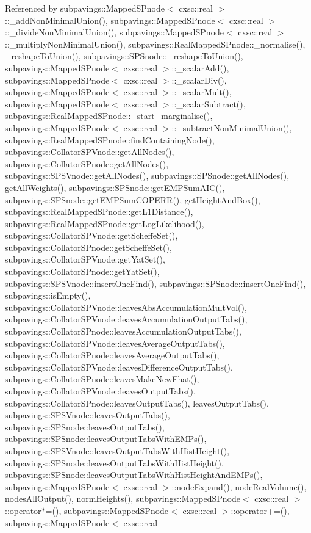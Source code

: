 \-Referenced by subpavings\-::\-Mapped\-S\-Pnode$<$ cxsc\-::real $>$\-::\-\_\-add\-Non\-Minimal\-Union(), subpavings\-::\-Mapped\-S\-Pnode$<$ cxsc\-::real $>$\-::\-\_\-divide\-Non\-Minimal\-Union(), subpavings\-::\-Mapped\-S\-Pnode$<$ cxsc\-::real $>$\-::\-\_\-multiply\-Non\-Minimal\-Union(), subpavings\-::\-Real\-Mapped\-S\-Pnode\-::\-\_\-normalise(), \-\_\-reshape\-To\-Union(), subpavings\-::\-S\-P\-Snode\-::\-\_\-reshape\-To\-Union(), subpavings\-::\-Mapped\-S\-Pnode$<$ cxsc\-::real $>$\-::\-\_\-scalar\-Add(), subpavings\-::\-Mapped\-S\-Pnode$<$ cxsc\-::real $>$\-::\-\_\-scalar\-Div(), subpavings\-::\-Mapped\-S\-Pnode$<$ cxsc\-::real $>$\-::\-\_\-scalar\-Mult(), subpavings\-::\-Mapped\-S\-Pnode$<$ cxsc\-::real $>$\-::\-\_\-scalar\-Subtract(), subpavings\-::\-Real\-Mapped\-S\-Pnode\-::\-\_\-start\-\_\-marginalise(), subpavings\-::\-Mapped\-S\-Pnode$<$ cxsc\-::real $>$\-::\-\_\-subtract\-Non\-Minimal\-Union(), subpavings\-::\-Real\-Mapped\-S\-Pnode\-::find\-Containing\-Node(), subpavings\-::\-Collator\-S\-P\-Vnode\-::get\-All\-Nodes(), subpavings\-::\-Collator\-S\-Pnode\-::get\-All\-Nodes(), subpavings\-::\-S\-P\-S\-Vnode\-::get\-All\-Nodes(), subpavings\-::\-S\-P\-Snode\-::get\-All\-Nodes(), get\-All\-Weights(), subpavings\-::\-S\-P\-Snode\-::get\-E\-M\-P\-Sum\-A\-I\-C(), subpavings\-::\-S\-P\-Snode\-::get\-E\-M\-P\-Sum\-C\-O\-P\-E\-R\-R(), get\-Height\-And\-Box(), subpavings\-::\-Real\-Mapped\-S\-Pnode\-::get\-L1\-Distance(), subpavings\-::\-Real\-Mapped\-S\-Pnode\-::get\-Log\-Likelihood(), subpavings\-::\-Collator\-S\-P\-Vnode\-::get\-Scheffe\-Set(), subpavings\-::\-Collator\-S\-Pnode\-::get\-Scheffe\-Set(), subpavings\-::\-Collator\-S\-P\-Vnode\-::get\-Yat\-Set(), subpavings\-::\-Collator\-S\-Pnode\-::get\-Yat\-Set(), subpavings\-::\-S\-P\-S\-Vnode\-::insert\-One\-Find(), subpavings\-::\-S\-P\-Snode\-::insert\-One\-Find(), subpavings\-::is\-Empty(), subpavings\-::\-Collator\-S\-P\-Vnode\-::leaves\-Abs\-Accumulation\-Mult\-Vol(), subpavings\-::\-Collator\-S\-P\-Vnode\-::leaves\-Accumulation\-Output\-Tabs(), subpavings\-::\-Collator\-S\-Pnode\-::leaves\-Accumulation\-Output\-Tabs(), subpavings\-::\-Collator\-S\-P\-Vnode\-::leaves\-Average\-Output\-Tabs(), subpavings\-::\-Collator\-S\-Pnode\-::leaves\-Average\-Output\-Tabs(), subpavings\-::\-Collator\-S\-P\-Vnode\-::leaves\-Difference\-Output\-Tabs(), subpavings\-::\-Collator\-S\-Pnode\-::leaves\-Make\-New\-Fhat(), subpavings\-::\-Collator\-S\-P\-Vnode\-::leaves\-Output\-Tabs(), subpavings\-::\-Collator\-S\-Pnode\-::leaves\-Output\-Tabs(), leaves\-Output\-Tabs(), subpavings\-::\-S\-P\-S\-Vnode\-::leaves\-Output\-Tabs(), subpavings\-::\-S\-P\-Snode\-::leaves\-Output\-Tabs(), subpavings\-::\-S\-P\-Snode\-::leaves\-Output\-Tabs\-With\-E\-M\-Ps(), subpavings\-::\-S\-P\-S\-Vnode\-::leaves\-Output\-Tabs\-With\-Hist\-Height(), subpavings\-::\-S\-P\-Snode\-::leaves\-Output\-Tabs\-With\-Hist\-Height(), subpavings\-::\-S\-P\-Snode\-::leaves\-Output\-Tabs\-With\-Hist\-Height\-And\-E\-M\-Ps(), subpavings\-::\-Mapped\-S\-Pnode$<$ cxsc\-::real $>$\-::node\-Expand(), node\-Real\-Volume(), nodes\-All\-Output(), norm\-Heights(), subpavings\-::\-Mapped\-S\-Pnode$<$ cxsc\-::real $>$\-::operator$\ast$=(), subpavings\-::\-Mapped\-S\-Pnode$<$ cxsc\-::real $>$\-::operator+=(), subpavings\-::\-Mapped\-S\-Pnode$<$ cxsc\-::real 